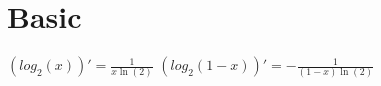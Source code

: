 \documentclass[12pt,a4paper]{extarticle}
\begin{document}
\section{Basic}
$(log_2(x))'=\frac{1}{x\ln(2)}$ \quad $(log_2(1-x))'=-\frac{1}{(1-x)\ln(2)}$\\                                                                                                                                                                                                                                                                                                                                                                                                                                                                                                                                                                                                                                                                                                                                                                                                                                                                                                                                                                                                                                                                                                                                                                                                                                                                                                                                                                                                                                                                                                                                                                                                                                                                                                                                                                                                                                                                                                                                                                                                                                                                                                                                                                                                                                                                                                                                                                                                                                                                                                                                                                                                                                                                                                                                                                                                                                                                                                                                                                                                                                                                                                                                      
\end{document}
